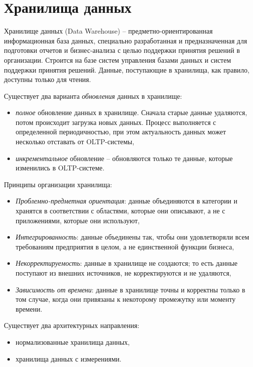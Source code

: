 \documentclass[%
	11pt,
	a4paper,
	utf8,
		]{article}
\begin{document}
\section{Хранилища данных}

Хранилище данных (Data Warehouse) -- предметно-ориентированная информационная база данных, специально разработанная и предназначенная для подготовки отчетов и бизнес-анализа с целью поддержки принятия решений в организации. Строится на базе систем управления базами данных и систем поддержки принятия решений. Данные, поступающие в хранилища, как правило, доступны только для чтения.

Существует два варианта \emph{обновления} данных в хранилище:
\begin{itemize}
	\item \emph{полное} обновление данных в хранилище. Сначала старые данные удаляются, потом происходит загрузка новых данных. Процесс выполняется с определенной периодичностью, при этом актуальность данных может несколько отставать от OLTP-системы,
	
	\item \emph{инкрементальное} обновление -- обновляются только те данные, которые изменились в OLTP-системе.
\end{itemize}

Принципы организации хранилища:
\begin{itemize}
	\item \emph{Проблемно-предметная ориентация}: данные объединяются в категории и хранятся в соответствии с областями, которые они описывают, а не с приложениями, которые они используют,
	
	\item \emph{Интегрированность}: данные объединены так, чтобы они удовлетворяли всем требованиям предприятия в целом, а не единственной функции бизнеса,
	
	\item \emph{Некорректируемость}: данные в хранилище не создаются; то есть данные поступают из внешних источников, не корректируются и не удаляются,
	
	\item \emph{Зависимость от времени}: данные в хранилище точны и корректны только в том случае, когда они привязаны к некоторому промежутку или моменту времени.
\end{itemize}

Существует два архитектурных направления:
\begin{itemize}
	\item {нормализованные хранилища данных},
	
	\item  {хранилища данных с измерениями}.
\end{itemize}
\end{document}
